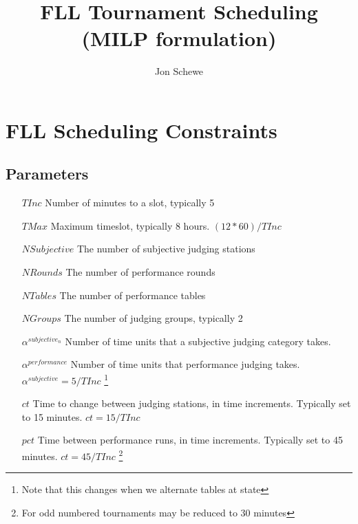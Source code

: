 \documentclass[letterpaper,11pt]{report}
\title{FLL Tournament Scheduling (MILP formulation)}
\author{Jon Schewe}
\newcommand{\doccomment}[3]%
{\marginpar{\textcolor{#2}{\bf #1}}%
\footnote{{\color{#2}#3}}%
}
\newcommand{\doccomment}[3]{}
\newcommand{\jpscomment}[1]%
{\doccomment{SCHEWE}{Bittersweet}{#1}}
\begin{document}
\maketitle

\chapter{FLL Scheduling Constraints}

\section{Parameters}
\begin{itemize}

\item[$TInc$] Number of minutes to a slot, typically 5
\item[$TMax$] Maximum timeslot, typically 8 hours. $(12 * 60)/TInc$
\item[$NSubjective$] The number of subjective judging stations
\item[$NRounds$] The number of performance rounds
\item[$NTables$] The number of performance tables
\item[$NGroups$] The number of judging groups, typically 2

\item[$\alpha^{subjective_{n}}$] Number of time units that a subjective judging
  category takes.

\item[$\alpha^{performance}$] Number of time units that performance judging
  takes. $\alpha^{subjective} = 5 / TInc$ \jpscomment{Note that this
changes when we alternate tables at state}

\item[$ct$] Time to change between judging stations, in time increments. Typically set to 15
  minutes. $ct = 15/TInc$
\item[$pct$] Time between performance runs, in time increments. Typically set to 45
  minutes. $ct = 45/TInc$ \jpscomment{For odd numbered tournaments may be reduced to 30
    minutes}

\end{itemize}
\end{document}
